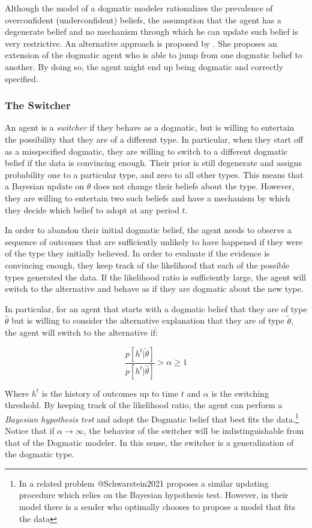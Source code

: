\documentclass[
  12pt,
]{article}
\begin{document}
Although the model of a dogmatic modeler rationalizes the prevalence of
overconfident (underconfident) beliefs, the assumption that the agent
has a degenerate belief and no mechanism through which he can update
such belief is very restrictive. An alternative approach is proposed by
\citet{Ba2023}. She proposes an extension of the dogmatic agent who is
able to jump from one dogmatic belief to another. By doing so, the agent
might end up being dogmatic and correctly specified.

\hypertarget{the-switcher}{%
\subsubsection{The Switcher}\label{the-switcher}}

An agent is a \emph{switcher} if they behave as a dogmatic, but is
willing to entertain the possibility that they are of a different type.
In particular, when they start off as a misspecified dogmatic, they are
willing to switch to a different dogmatic belief if the data is
convincing enough. Their prior is still degenerate and assigns
probability one to a particular type, and zero to all other types. This
means that a Bayesian update on \(\theta\) does not change their beliefs
about the type. However, they are willing to entertain two such beliefs
and have a mechanism by which they decide which belief to adopt at any
period \(t\).

In order to abandon their initial dogmatic belief, the agent needs to
observe a sequence of outcomes that are sufficiently unlikely to have
happened if they were of the type they initially believed. In order to
evaluate if the evidence is convincing enough, they keep track of the
likelihood that each of the possible types generated the data. If the
likelihood ratio is sufficiently large, the agent will switch to the
alternative and behave as if they are dogmatic about the new type.

In particular, for an agent that starts with a dogmatic belief that they
are of type \(\hat{\theta}\) but is willing to consider the alternative
explanation that they are of type \(\tilde{\theta}\), the agent will
switch to the alternative if:

\[\frac{p[h^t|\tilde{\theta}]}{p[h^t|\hat{\theta}]} > \alpha\geq 1\]

Where \(h^t\) is the history of outcomes up to time \(t\) and \(\alpha\)
is the switching threshold. By keeping track of the likelihood ratio,
the agent can perform a \emph{Bayesian hypothesis test} and adopt the
Dogmatic belief that best fits the
data.\footnote{In a related problem @Schwarstein2021 proposes a similar updating procedure which relies on the Bayesian 
hypothesis test. However, in their model there is a sender who optimally chooses to propose a model that fits the data}
Notice that if \(\alpha \to \infty\), the behavior of the switcher will
be indistinguishable from that of the Dogmatic modeler. In this sense,
the switcher is a generalization of the dogmatic type.
\end{document}
